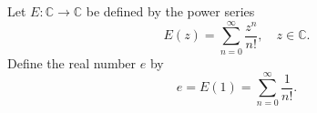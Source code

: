 Let $E: \mathbb{C} \to \mathbb{C}$ be defined by the power series
$$E(z) = \sum_{n=0}^{\infty} \frac{z^n}{n!}, \quad z \in \mathbb{C}.$$
Define the real number $e$ by
$$e = E(1) = \sum_{n=0}^{\infty} \frac{1}{n!}.$$

